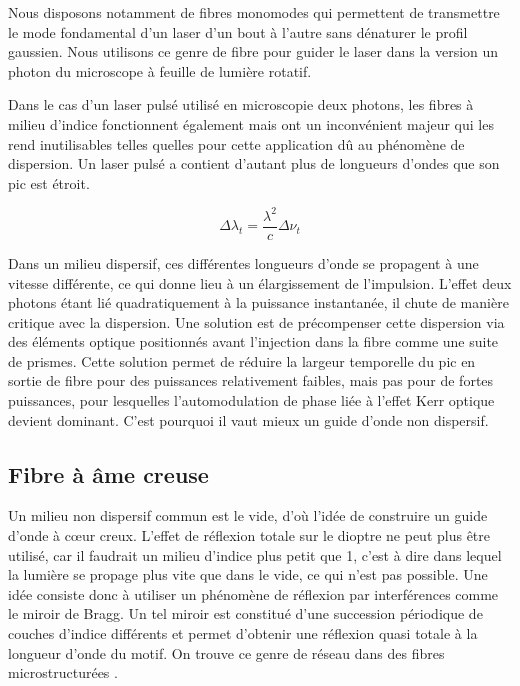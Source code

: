 Nous disposons notamment de fibres monomodes qui permettent de transmettre le mode fondamental d'un laser d'un bout à l'autre sans dénaturer le profil gaussien. Nous utilisons ce genre de fibre pour guider le laser dans la version un photon du microscope à feuille de lumière rotatif.

Dans le cas d'un laser pulsé utilisé en microscopie deux photons, les fibres à milieu d'indice fonctionnent également mais ont un inconvénient majeur qui les rend inutilisables telles quelles pour cette application dû au phénomène de dispersion. Un laser pulsé a contient d'autant plus de longueurs d'ondes que son pic est étroit.

$$
\Delta \lambda_t = \frac{\lambda^2}{c}\Delta\nu_t
$$

Dans un milieu dispersif, ces différentes longueurs d'onde se propagent à une vitesse différente, ce qui donne lieu à un élargissement de l'impulsion. L'effet deux photons étant lié quadratiquement à la puissance instantanée, il chute de manière critique avec la dispersion. Une solution est de précompenser cette dispersion via des éléments optique positionnés avant l'injection dans la fibre comme une suite de prismes. Cette solution permet de réduire la largeur temporelle du pic en sortie de fibre pour des puissances relativement faibles, mais pas pour de fortes puissances, pour lesquelles l'automodulation de phase liée à l'effet Kerr optique devient dominant. C'est pourquoi il vaut mieux un guide d'onde non dispersif.

\subsection{Fibre à âme creuse}

Un milieu non dispersif commun est le vide, d'où l'idée de construire un guide d'onde à cœur creux. L'effet de réflexion totale sur le dioptre ne peut plus être utilisé, car il faudrait un milieu d'indice plus petit que 1, c'est à dire dans lequel la lumière se propage plus vite que dans le vide, ce qui n'est pas possible. Une idée consiste donc à utiliser un phénomène de réflexion par interférences comme le miroir de Bragg. Un tel miroir est constitué d'une succession périodique de couches d'indice différents et permet d'obtenir une réflexion quasi totale à la longueur d'onde du motif. On trouve ce genre de réseau dans des fibres microstructurées \cite{argyros_hollow-core_2006}.

